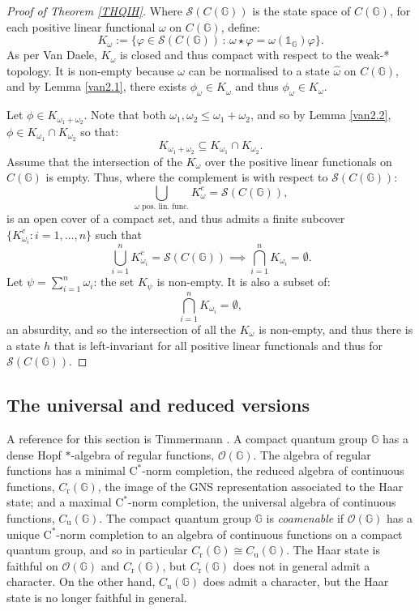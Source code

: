 \documentclass[12pt]{amsart}
\theoremstyle{remark}
\theoremstyle{remark}
\begin{document}
\begin{proof}[Proof of Theorem \ref{THQIH}]
  Where $\mathcal{S}(C(\mathbb{G}))$ is the state space of $C(\mathbb{G})$, for each positive linear functional $\omega$ on $C(\mathbb{G})$, define:
  $$K_{\omega}:=\{\varphi\in\mathcal{S}(C(\mathbb{G}))\,\colon\,\omega\star\varphi=\omega(\mathds{1}_{\mathbb{G}})\varphi\}.$$
  As per Van Daele, $K_\omega$ is closed and thus compact with respect to the weak-* topology. It is non-empty because $\omega$ can be normalised to a state $\widehat{\omega}$ on $C(\mathbb{G})$, and by Lemma \ref{van2.1}, there exists $\phi_\omega\in K_{\widehat{\omega}}$ and thus $\phi_\omega\in K_\omega$.

  \bigskip

  Let $\phi\in K_{\omega_1+\omega_2}$. Note that both $\omega_1,\omega_2\leq \omega_1+\omega_2$, and so by Lemma \ref{van2.2}, $\phi\in K_{\omega_1}\cap K_{\omega_2}$ so that:
  $$K_{\omega_1+\omega_2}\subseteq K_{\omega_1}\cap K_{\omega_2}.$$
  Assume that the intersection of the $K_\omega$ over the positive linear functionals on $C(\mathbb{G})$ is empty. Thus, where the complement is with respect to $\mathcal{S}(C(\mathbb{G}))$:
  $$\bigcup_{\omega\text{ pos. lin. func.}}K_\omega^c=\mathcal{S}(C(\mathbb{G})),$$
  is an open cover of a compact set, and thus admits a finite subcover $\{K_{\omega_i}^c\colon i=1,\dots,n\}$ such that
  $$\bigcup_{i=1}^n K_{\omega_i}^c=\mathcal{S}(C(\mathbb{G}))\implies \bigcap_{i=1}^nK_{\omega_i}=\emptyset.$$
  Let $\psi=\sum_{i=1}^n\omega_i$: the set $K_\psi$ is non-empty. It is also a subset of:
  $$ \bigcap_{i=1}^nK_{\omega_i}=\emptyset,$$
  an absurdity, and so the intersection of all the $K_\omega$ is non-empty, and thus there is a state $h$ that is left-invariant for all positive linear functionals and thus for $\mathcal{S}(C(\mathbb{G}))$.
\end{proof}
\subsection{The universal and reduced versions}
A reference for this section is Timmermann \cite{tim}. A compact quantum group $\mathbb{G}$ has a dense Hopf $\ast$-algebra of regular functions, $\mathcal{O}(\mathbb{G})$. The algebra of regular functions has a minimal $\mathrm{C}^*$-norm completion, the reduced algebra of continuous functions, $C_{\text{r}}(\mathbb{G})$, the image of the GNS representation associated to the Haar state; and a maximal $\mathrm{C}^*$-norm completion, the universal algebra of continuous functions, $C_{\text{u}}(\mathbb{G})$. The compact quantum group $\mathbb{G}$ is \emph{coamenable} if $\mathcal{O}(\mathbb{G})$ has a unique $\mathrm{C}^*$-norm completion to an algebra of continuous functions on a compact quantum group, and so in particular $C_{\text{r}}(\mathbb{G})\cong C_{\text{u}}(\mathbb{G})$. The Haar state is faithful on $\mathcal{O}(\mathbb{G})$ and $C_{\text{r}}(\mathbb{G})$, but $C_{\text{r}}(\mathbb{G})$ does not in general admit a character. On the other hand, $C_{\text{u}}(\mathbb{G})$ does admit a character, but the Haar state is no longer faithful in general.
\end{document}
